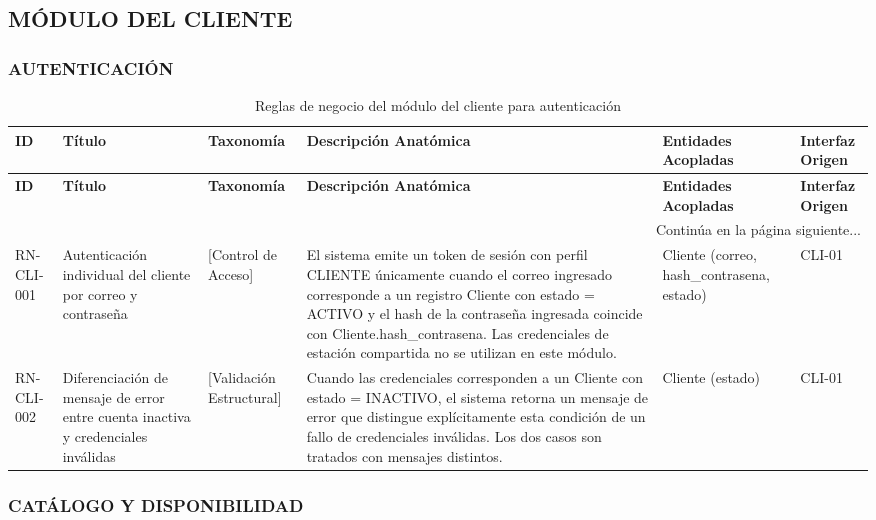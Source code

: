 \begin{landscape}
\subsection{MÓDULO DEL CLIENTE}
\subsubsection{AUTENTICACIÓN}
\begingroup
\setlength{\LTleft}{\fill}
\setlength{\LTright}{\fill}

\begin{longtable}[c]{l p{2.1cm} p{2.1cm} p{8cm} p{4cm} p{3cm}}
\caption{Reglas de negocio del módulo del cliente para autenticación} \label{tab:reglas-negocio-cliente-autenticacion}\\
\toprule
\textbf{ID} & \textbf{Título} & \textbf{Taxonomía} & \textbf{Descripción Anatómica} & \textbf{Entidades Acopladas} & \textbf{Interfaz Origen} \\
\midrule
\endfirsthead

\toprule
\textbf{ID} & \textbf{Título} & \textbf{Taxonomía} & \textbf{Descripción Anatómica} & \textbf{Entidades Acopladas} & \textbf{Interfaz Origen} \\
\midrule
\endhead

\midrule
\multicolumn{6}{r}{\small Continúa en la página siguiente...} \\
\endfoot
\bottomrule
\endlastfoot

RN-CLI-001 & Autenticación individual del cliente por correo y contraseña & [Control de Acceso] & El sistema emite un token de sesión con perfil CLIENTE únicamente cuando el correo ingresado corresponde a un registro Cliente con estado = ACTIVO y el hash de la contraseña ingresada coincide con Cliente.hash\_contrasena. Las credenciales de estación compartida no se utilizan en este módulo. & Cliente (correo, hash\_contrasena, estado) & CLI-01 \\
\addlinespace
RN-CLI-002 & Diferenciación de mensaje de error entre cuenta inactiva y credenciales inválidas & [Validación Estructural] & Cuando las credenciales corresponden a un Cliente con estado = INACTIVO, el sistema retorna un mensaje de error que distingue explícitamente esta condición de un fallo de credenciales inválidas. Los dos casos son tratados con mensajes distintos. & Cliente (estado) & CLI-01 \\
\end{longtable}
\endgroup

\subsubsection{CATÁLOGO Y DISPONIBILIDAD}
\begingroup
\setlength{\LTleft}{\fill}
\setlength{\LTright}{\fill}


\end{landscape}
